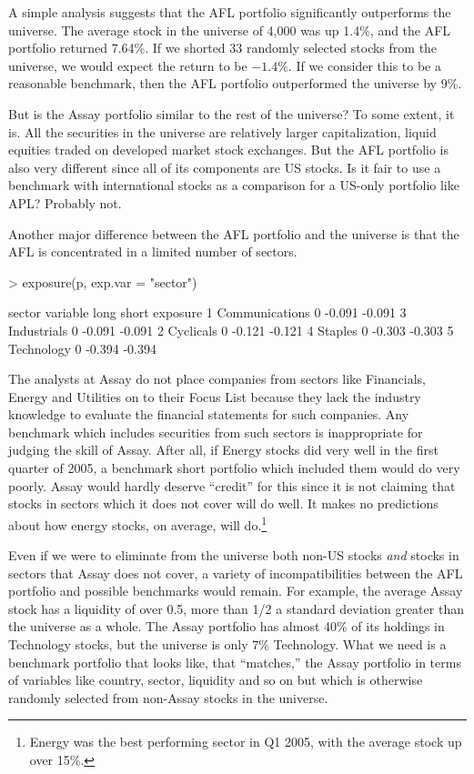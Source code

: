 \documentclass{article}
\begin{document}
A simple analysis suggests that the AFL portfolio significantly
outperforms the universe.  The average stock in the universe of 4,000
was up 1.4\%, and the AFL portfolio returned 7.64\%.  If we shorted 33
randomly selected stocks from the universe, we would expect the return
to be $-1.4\%$.  If we consider this to be a reasonable benchmark,
then the AFL portfolio outperformed the universe by 9\%.

But is the Assay portfolio similar to the rest of the universe? To
some extent, it is. All the securities in the universe are relatively
larger capitalization, liquid equities traded on developed market
stock exchanges. But the AFL portfolio is also very different since
all of its components are US stocks. Is it fair to use a benchmark
with international stocks as a comparison for a US-only portfolio like
APL? Probably not.

Another major difference between the AFL portfolio and the universe is
that the AFL is concentrated in a limited number of sectors.

\begin{Schunk}
\begin{Sinput}
> exposure(p, exp.var = "sector")
\end{Sinput}
\begin{Soutput}
sector 
        variable long  short exposure
1 Communications    0 -0.091   -0.091
3    Industrials    0 -0.091   -0.091
2      Cyclicals    0 -0.121   -0.121
4        Staples    0 -0.303   -0.303
5     Technology    0 -0.394   -0.394
\end{Soutput}
\end{Schunk}

The analysts at Assay do not place companies from sectors like
Financials, Energy and Utilities on to their Focus List because they
lack the industry knowledge to evaluate the financial statements for
such companies. Any benchmark which includes securities from such
sectors is inappropriate for judging the skill of Assay. After all, if
Energy stocks did very well in the first quarter of 2005, a benchmark
short portfolio which included them would do very poorly. Assay would
hardly deserve ``credit'' for this since it is not claiming that
stocks in sectors which it does not cover will do well. It makes no
predictions about how energy stocks, on average, will
do.\footnote{Energy was the best performing sector in Q1 2005, with
the average stock up over 15\%.}

Even if we were to eliminate from the universe both non-US stocks
\emph{and} stocks in sectors that Assay does not cover, a variety of
incompatibilities between the AFL portfolio and possible benchmarks
would remain.  For example, the average Assay stock has a liquidity of
over 0.5, more than 1/2 a standard deviation greater than the universe
as a whole. The Assay portfolio has almost 40\% of its holdings in
Technology stocks, but the universe is only 7\% Technology. What we
need is a benchmark portfolio that looks like, that ``matches,'' the
Assay portfolio in terms of variables like country, sector, liquidity
and so on but which is otherwise randomly selected from non-Assay
stocks in the universe.
\end{document}

